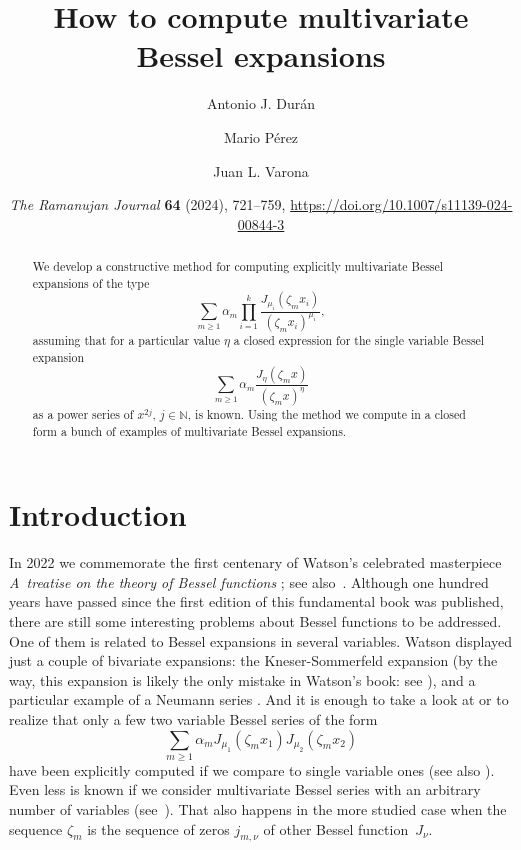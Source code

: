 \documentclass[12pt,leqno]{amsart}
\title[How to compute multivariate Bessel expansions]
{How to compute multivariate Bessel expansions}
\author[A.~J.~Dur\'an]{Antonio J. Dur\'an}
\author[M.~P\'erez]{Mario P\'erez}
\author[J.~L.~Varona]{Juan L. Varona}
\date{\textit{The Ramanujan Journal} \textbf{64} (2024), 721--759, 
\url{https://doi.org/10.1007/s11139-024-00844-3}}
\numberwithin{equation}{section}
\theoremstyle{plain}
\begin{document}



\begin{abstract}
We develop a constructive method for computing explicitly
multivariate Bessel expansions of the type
\[
\sum_{m\ge 1} \alpha_m \prod_{i=1}^k \frac{J_{\mu_i}(\zeta_m x_i)}{(\zeta_m x_i)^{\mu_i}},
\]
assuming that for a particular value $\eta$ a closed expression for the single variable Bessel expansion
\[
\sum_{m\ge 1}\alpha_m \frac{J_{\eta}(\zeta_m x)}{(\zeta_m x)^\eta}
\]
as a power series of $x^{2j}$, $j\in \mathbb{N}$, is known. Using the method we compute in a closed form a bunch of examples of multivariate Bessel expansions.
\end{abstract}

\maketitle

\section{Introduction}

In 2022 we commemorate the first centenary of Watson's celebrated masterpiece \textit{A~treatise on the theory of Bessel functions} \cite{Wat}; see also~\cite{Mar2}.
Although one hundred years have passed since the first edition of this fundamental book was published, there are still some interesting problems about Bessel functions to be addressed. One of them is related to Bessel expansions in several variables. Watson displayed just a couple of bivariate expansions: the Kneser-Sommerfeld expansion \cite[\S\,15.42, p.~499]{Wat} (by the way, this expansion is likely the only mistake in Watson's book: see \cite{Mar}), and a particular example of a Neumann series \cite[\S\,16.32, p.~531]{Wat}.
And it is enough to take a look at
\cite[Sect.~5.7]{PBM1} or \cite[Sect.~6.8]{Br} to realize that only a few two variable Bessel series of the form
\[
\sum_{m\ge 1} \alpha_m J_{\mu_1}(\zeta_m x_1)J_{\mu_2}(\zeta_m x_2)
\]
have been explicitly computed if we compare to single variable ones (see also \cite{DGMT, Gre, KhYa}). Even less is known if we consider multivariate Bessel series with an arbitrary number of variables (see~\cite{Rawn}). That also happens in the more studied case when the sequence $\zeta_m$ is the sequence of zeros $j_{m,\nu}$ of other Bessel function~$J_\nu$.
\end{document}
